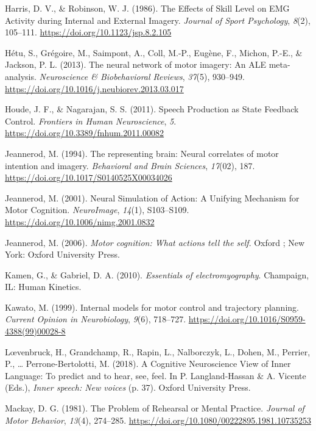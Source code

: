 \documentclass[a4paper,12pt,twoside,openright,oldfontcommands]{memoir}
\begin{document}
\hypertarget{ref-harris_effects_1986}{}
Harris, D. V., \& Robinson, W. J. (1986). The Effects of Skill Level on
EMG Activity during Internal and External Imagery. \emph{Journal of
Sport Psychology}, \emph{8}(2), 105--111.
\url{https://doi.org/10.1123/jsp.8.2.105}

\hypertarget{ref-hetu_neural_2013}{}
Hétu, S., Grégoire, M., Saimpont, A., Coll, M.-P., Eugène, F., Michon,
P.-E., \& Jackson, P. L. (2013). The neural network of motor imagery: An
ALE meta-analysis. \emph{Neuroscience \& Biobehavioral Reviews},
\emph{37}(5), 930--949.
\url{https://doi.org/10.1016/j.neubiorev.2013.03.017}

\hypertarget{ref-houde_speech_2011}{}
Houde, J. F., \& Nagarajan, S. S. (2011). Speech Production as State
Feedback Control. \emph{Frontiers in Human Neuroscience}, \emph{5}.
\url{https://doi.org/10.3389/fnhum.2011.00082}

\hypertarget{ref-jeannerod_representing_1994}{}
Jeannerod, M. (1994). The representing brain: Neural correlates of motor
intention and imagery. \emph{Behavioral and Brain Sciences},
\emph{17}(02), 187. \url{https://doi.org/10.1017/S0140525X00034026}

\hypertarget{ref-jeannerod_neural_2001}{}
Jeannerod, M. (2001). Neural Simulation of Action: A Unifying Mechanism
for Motor Cognition. \emph{NeuroImage}, \emph{14}(1), S103--S109.
\url{https://doi.org/10.1006/nimg.2001.0832}

\hypertarget{ref-jeannerod_motor_2006}{}
Jeannerod, M. (2006). \emph{Motor cognition: What actions tell the
self}. Oxford ; New York: Oxford University Press.

\hypertarget{ref-kamen_essentials_2010}{}
Kamen, G., \& Gabriel, D. A. (2010). \emph{Essentials of
electromyography}. Champaign, IL: Human Kinetics.

\hypertarget{ref-kawato_internal_1999}{}
Kawato, M. (1999). Internal models for motor control and trajectory
planning. \emph{Current Opinion in Neurobiology}, \emph{9}(6), 718--727.
\url{https://doi.org/10.1016/S0959-4388(99)00028-8}

\hypertarget{ref-loevenbruck_cognitive_2018}{}
Lœvenbruck, H., Grandchamp, R., Rapin, L., Nalborczyk, L., Dohen, M.,
Perrier, P., \ldots{} Perrone-Bertolotti, M. (2018). A Cognitive
Neuroscience View of Inner Language: To predict and to hear, see, feel.
In P. Langland-Hassan \& A. Vicente (Eds.), \emph{Inner speech: New
voices} (p. 37). Oxford University Press.

\hypertarget{ref-mackay_problem_1981}{}
Mackay, D. G. (1981). The Problem of Rehearsal or Mental Practice.
\emph{Journal of Motor Behavior}, \emph{13}(4), 274--285.
\url{https://doi.org/10.1080/00222895.1981.10735253}
\end{document}
